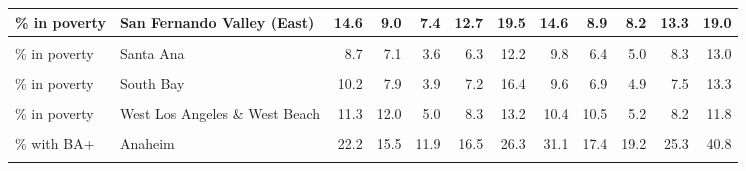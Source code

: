 \begin{table}[!h]
\begin{tabular}[t]{l|>{}l||r|r|r|r|r|r|r|r|r|r}
\hline
\% in poverty & San Fernando Valley (East) & 14.6 & 9.0 & 7.4 & 12.7 & 19.5 & 14.6 & 8.9 & 8.2 & 13.3 & 19.0\\
\hline
\cellcolor{gray!6}{\% in poverty} & \cellcolor{gray!6}{San Fernando Valley (West)} & \cellcolor{gray!6}{8.2} & \cellcolor{gray!6}{7.0} & \cellcolor{gray!6}{3.5} & \cellcolor{gray!6}{6.0} & \cellcolor{gray!6}{10.8} & \cellcolor{gray!6}{9.8} & \cellcolor{gray!6}{7.8} & \cellcolor{gray!6}{4.2} & \cellcolor{gray!6}{8.1} & \cellcolor{gray!6}{13.3}\\
\hline
\% in poverty & Santa Ana & 8.7 & 7.1 & 3.6 & 6.3 & 12.2 & 9.8 & 6.4 & 5.0 & 8.3 & 13.0\\
\hline
\cellcolor{gray!6}{\% in poverty} & \cellcolor{gray!6}{South \& South Central Los Angeles} & \cellcolor{gray!6}{26.7} & \cellcolor{gray!6}{12.7} & \cellcolor{gray!6}{17.9} & \cellcolor{gray!6}{26.1} & \cellcolor{gray!6}{35.7} & \cellcolor{gray!6}{21.7} & \cellcolor{gray!6}{11.5} & \cellcolor{gray!6}{13.7} & \cellcolor{gray!6}{20.6} & \cellcolor{gray!6}{28.5}\\
\hline
\% in poverty & South Bay & 10.2 & 7.9 & 3.9 & 7.2 & 16.4 & 9.6 & 6.9 & 4.9 & 7.5 & 13.3\\
\hline
\cellcolor{gray!6}{\% in poverty} & \cellcolor{gray!6}{South Orange Co} & \cellcolor{gray!6}{5.4} & \cellcolor{gray!6}{5.9} & \cellcolor{gray!6}{2.5} & \cellcolor{gray!6}{4.0} & \cellcolor{gray!6}{6.4} & \cellcolor{gray!6}{7.5} & \cellcolor{gray!6}{6.0} & \cellcolor{gray!6}{3.7} & \cellcolor{gray!6}{6.1} & \cellcolor{gray!6}{9.6}\\
\hline
\% in poverty & West Los Angeles \& West Beach & 11.3 & 12.0 & 5.0 & 8.3 & 13.2 & 10.4 & 10.5 & 5.2 & 8.2 & 11.8\\
\hline
\cellcolor{gray!6}{\% in poverty} & \cellcolor{gray!6}{Whittier \& North Orange Co} & \cellcolor{gray!6}{9.3} & \cellcolor{gray!6}{5.7} & \cellcolor{gray!6}{5.1} & \cellcolor{gray!6}{8.1} & \cellcolor{gray!6}{12.3} & \cellcolor{gray!6}{9.3} & \cellcolor{gray!6}{5.9} & \cellcolor{gray!6}{4.9} & \cellcolor{gray!6}{8.3} & \cellcolor{gray!6}{12.8}\\
\hline
\% with BA+ & Anaheim & 22.2 & 15.5 & 11.9 & 16.5 & 26.3 & 31.1 & 17.4 & 19.2 & 25.3 & 40.8\\
\hline
\hline
\cellcolor{gray!6}{\% with BA+} & \cellcolor{gray!6}{Covina \& West Covina} & \cellcolor{gray!6}{23.8} & \cellcolor{gray!6}{16.0} & \cellcolor{gray!6}{10.2} & \cellcolor{gray!6}{20.4} & \cellcolor{gray!6}{35.3} & \cellcolor{gray!6}{30.5} & \cellcolor{gray!6}{16.6} & \cellcolor{gray!6}{16.2} & \cellcolor{gray!6}{28.5} & \cellcolor{gray!6}{44.0}\\

\end{tabular}
\end{table}
